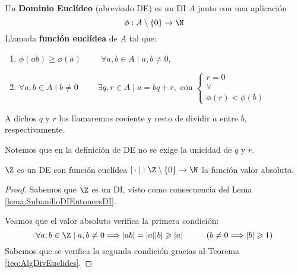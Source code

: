 \begin{definicion}
    Un \textbf{Dominio Euclídeo} (abreviado DE) es un DI $A$ junto con una aplicación
    $$\phi:A\setminus\{0\}\rightarrow\N$$
    Llamada \textbf{función euclídea} de $A$ tal que:
    \begin{enumerate}
        \item $\phi(ab) \geq \phi(a)\hspace{1cm}\forall a,b \in A \mid a,b \neq 0$,
        \item  $\forall a,b \in A \mid b \neq 0\hspace{1cm}\exists q,r \in A \mid a =bq+r,\mbox{ con }
        \left\{\begin{array}{c}
            r=0 \\ \lor \\ \phi(r)<\phi(b)
        \end{array}\right.
        $
    \end{enumerate}
\end{definicion}

A dichos $q$ y $r$ los llamaremos cociente y resto de dividir $a$ entre $b$, respectivamente.
\begin{observacion}
    Notemos que en la definición de DE no se exige la unicidad de $q$ y $r$.
\end{observacion}

\begin{prop}
    \label{prop:ZDE}
    $\Z$ es un DE con función euclídea $|\cdot|:\Z\setminus\{0\}\rightarrow\N$ la función valor absoluto.
\end{prop}
\begin{proof}
    Sabemos que $\Z$ es un DI, visto como consecuencia del Lema \ref{lema:SubanilloDIEntoncesDI}.

    Veamos que el valor absoluto verifica la primera condición:
    $$\forall a,b \in \Z \mid a,b \neq 0 \Longrightarrow |ab| = |a||b| \geq |a| \hspace{1cm}(b \neq 0 \Longrightarrow |b|\geq1)$$
    Sabemos que se verifica la segunda condición gracias al Teorema \ref{teo:AlgDivEuclides}.
\end{proof}

